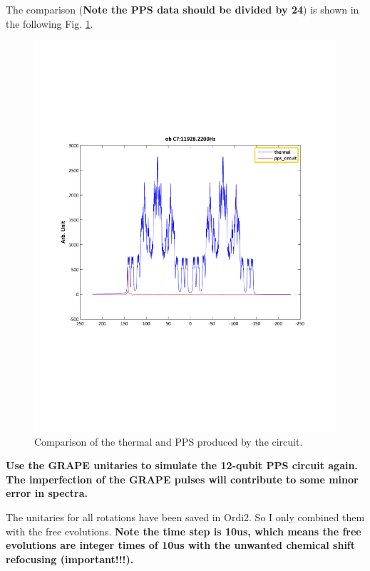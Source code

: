 The comparison (\textbf{Note the PPS data should be divided by 24}) is shown in the following Fig. \ref{spectra}.

\begin{figure}[htb]
\begin{center}
\includegraphics[width=\columnwidth]{thermal_and_pps_circuit.pdf}
\end{center}
\setlength{\abovecaptionskip}{-1cm}
\caption{\footnotesize{Comparison of the thermal and PPS produced by the circuit. }}\label{spectra}
\end{figure}

\clearpage
{}

\textbf{Use the GRAPE unitaries to simulate the 12-qubit PPS circuit again. The imperfection of the GRAPE pulses will contribute to some minor error in spectra.}

The unitaries for all rotations have been saved in Ordi2. So I only combined them with the free evolutions. \textbf{Note the time step is 10us, which means the free evolutions are integer times of 10us with the unwanted chemical shift refocusing (important!!!).}

